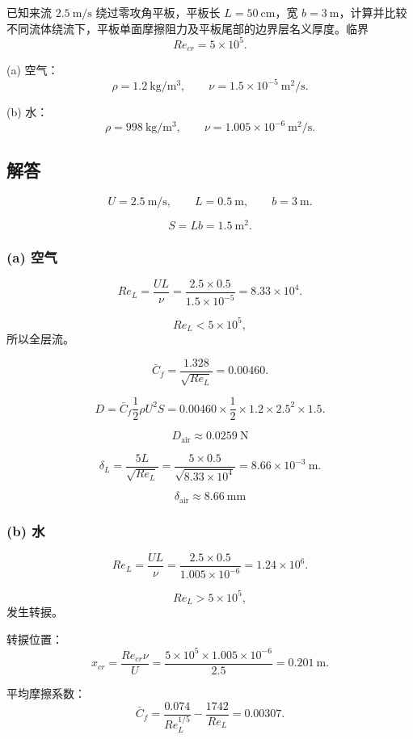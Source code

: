 ﻿\documentclass[11pt,a4paper]{ctexart}
\begin{document}
已知来流 \(2.5\ \mathrm{m/s}\) 绕过零攻角平板，平板长 \(L=50\ \mathrm{cm}\)，宽 \(b=3\ \mathrm{m}\)，计算并比较不同流体绕流下，平板单面摩擦阻力及平板尾部的边界层名义厚度。临界
\[
Re_{cr}=5\times10^5.
\]

(a) 空气：
\[
\rho=1.2\ \mathrm{kg/m^3},\qquad \nu=1.5\times10^{-5}\ \mathrm{m^2/s}.
\]

(b) 水：
\[
\rho=998\ \mathrm{kg/m^3},\qquad \nu=1.005\times10^{-6}\ \mathrm{m^2/s}.
\]

\subsection*{解答}

\[
U=2.5\ \mathrm{m/s},\qquad L=0.5\ \mathrm{m},\qquad b=3\ \mathrm{m}.
\]

\[
S=Lb=1.5\ \mathrm{m^2}.
\]

\subsubsection*{(a) 空气}

\[
Re_L=\frac{UL}{\nu}
=\frac{2.5\times0.5}{1.5\times10^{-5}}
=8.33\times10^4.
\]

\[
Re_L<5\times10^5,
\]
所以全层流。

\[
\bar C_f=\frac{1.328}{\sqrt{Re_L}}
=0.00460.
\]

\[
D=\bar C_f\frac12\rho U^2S
=0.00460\times\frac12\times1.2\times2.5^2\times1.5.
\]

\[
\boxed{D_{\mathrm{air}}\approx0.0259\ \mathrm{N}}
\]

\[
\delta_L=\frac{5L}{\sqrt{Re_L}}
=\frac{5\times0.5}{\sqrt{8.33\times10^4}}
=8.66\times10^{-3}\ \mathrm{m}.
\]

\[
\boxed{\delta_{\mathrm{air}}\approx8.66\ \mathrm{mm}}
\]

\subsubsection*{(b) 水}

\[
Re_L=\frac{UL}{\nu}
=\frac{2.5\times0.5}{1.005\times10^{-6}}
=1.24\times10^6.
\]

\[
Re_L>5\times10^5,
\]
发生转捩。

转捩位置：
\[
x_{cr}=\frac{Re_{cr}\nu}{U}
=\frac{5\times10^5\times1.005\times10^{-6}}{2.5}
=0.201\ \mathrm{m}.
\]

平均摩擦系数：
\[
\bar C_f=\frac{0.074}{Re_L^{1/5}}-\frac{1742}{Re_L}
=0.00307.
\]
\end{document}
